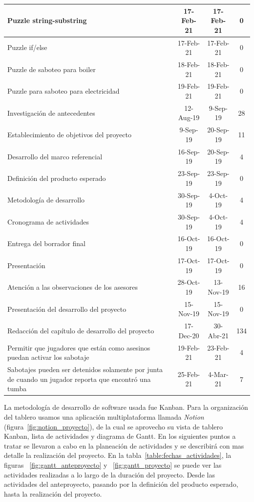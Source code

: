 \begin{longtable}[c]{|m{5cm}|c|c|c|}
\hline
Puzzle string-substring                            & 17-Feb-21 & 17-Feb-21 & 0      \\
\hline
Puzzle if/else                                     & 17-Feb-21 & 17-Feb-21 & 0      \\
\hline
Puzzle de saboteo para boiler                      & 18-Feb-21 & 18-Feb-21 & 0      \\
\hline
Puzzle para saboteo para electricidad              & 19-Feb-21 & 19-Feb-21 & 0      \\
\hline
Investigación de antecedentes                      & 12-Aug-19 & 9-Sep-19  & 28     \\
\hline
Establecimiento de objetivos del proyecto          & 9-Sep-19  & 20-Sep-19 & 11     \\
\hline
Desarrollo del marco referencial                   & 16-Sep-19 & 20-Sep-19 & 4      \\
\hline
Definición del producto esperado                   & 23-Sep-19 & 23-Sep-19 & 0      \\
\hline
Metodología de desarrollo                          & 30-Sep-19 & 4-Oct-19  & 4      \\
\hline
Cronograma de actividades                          & 30-Sep-19 & 4-Oct-19  & 4      \\
\hline
Entrega del borrador final                         & 16-Oct-19 & 16-Oct-19 & 0      \\
\hline
Presentación                                       & 17-Oct-19 & 17-Oct-19 & 0      \\
\hline
Atención a las observaciones de los asesores       & 28-Oct-19 & 13-Nov-19 & 16     \\
\hline
Presentación del desarrollo del proyecto           & 15-Nov-19 & 15-Nov-19 & 0      \\
\hline
Redacción del capítulo de desarrollo del proyecto  & 17-Dec-20 & 30-Abr-21 & 134      \\
\hline
Permitir que jugadores que están como asesinos puedan activar los sabotaje & 19-Feb-21 & 23-Feb-21 & 4 \\
\hline
Sabotajes pueden ser detenidos solamente por junta de cuando un jugador reporta que encontró una tumba & 25-Feb-21 & 4-Mar-21 & 7 \\
\hline
\end{longtable}

La metodología de desarrollo de software usada fue Kanban. Para la organización del tablero usamos una aplicación multiplataforma llamada  \textit{Notion} (figura~\ref{fig:notion_proyecto}), de la cual se aprovecho su vista de tablero Kanban, lista de actividades y diagrama de Gantt. En los siguientes puntos a tratar se llevaron a cabo en la planeación de actividades y se describirá con mas detalle la realización del proyecto. En la tabla~\ref{table:fechas_actividades}, la figuras ~\ref{fig:gantt_anteproyecto} y ~\ref{fig:gantt_proyecto} se puede ver las actividades realizadas a lo largo de la duración del proyecto. Desde las actividades del anteproyecto, pasando por la definición del producto esperado, hasta la realización del proyecto. 

